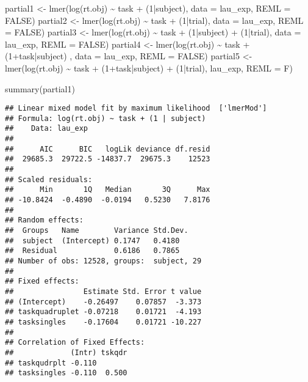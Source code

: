 \documentclass[
]{article}
\newenvironment{Shaded}{\begin{snugshade}}{\end{snugshade}}
\newcommand{\AttributeTok}[1]{\textcolor[rgb]{0.77,0.63,0.00}{#1}}
\newcommand{\ConstantTok}[1]{\textcolor[rgb]{0.00,0.00,0.00}{#1}}
\newcommand{\DecValTok}[1]{\textcolor[rgb]{0.00,0.00,0.81}{#1}}
\newcommand{\FunctionTok}[1]{\textcolor[rgb]{0.00,0.00,0.00}{#1}}
\newcommand{\NormalTok}[1]{#1}
\newcommand{\OtherTok}[1]{\textcolor[rgb]{0.56,0.35,0.01}{#1}}
\newcommand{\SpecialCharTok}[1]{\textcolor[rgb]{0.00,0.00,0.00}{#1}}
\begin{document}
\begin{Shaded}
\begin{Highlighting}[]
\NormalTok{partial1 }\OtherTok{\textless{}{-}} \FunctionTok{lmer}\NormalTok{(}\FunctionTok{log}\NormalTok{(rt.obj) }\SpecialCharTok{\textasciitilde{}}\NormalTok{ task }\SpecialCharTok{+}\NormalTok{ (}\DecValTok{1}\SpecialCharTok{|}\NormalTok{subject), }\AttributeTok{data =}\NormalTok{ lau\_exp, }\AttributeTok{REML =} \ConstantTok{FALSE}\NormalTok{)}
\NormalTok{partial2 }\OtherTok{\textless{}{-}} \FunctionTok{lmer}\NormalTok{(}\FunctionTok{log}\NormalTok{(rt.obj) }\SpecialCharTok{\textasciitilde{}}\NormalTok{ task }\SpecialCharTok{+}\NormalTok{ (}\DecValTok{1}\SpecialCharTok{|}\NormalTok{trial), }\AttributeTok{data =}\NormalTok{ lau\_exp, }\AttributeTok{REML =} \ConstantTok{FALSE}\NormalTok{)}
\NormalTok{partial3 }\OtherTok{\textless{}{-}} \FunctionTok{lmer}\NormalTok{(}\FunctionTok{log}\NormalTok{(rt.obj) }\SpecialCharTok{\textasciitilde{}}\NormalTok{ task }\SpecialCharTok{+}\NormalTok{ (}\DecValTok{1}\SpecialCharTok{|}\NormalTok{subject) }\SpecialCharTok{+}\NormalTok{ (}\DecValTok{1}\SpecialCharTok{|}\NormalTok{trial), }\AttributeTok{data =}\NormalTok{ lau\_exp, }\AttributeTok{REML =} \ConstantTok{FALSE}\NormalTok{)}
\NormalTok{partial4 }\OtherTok{\textless{}{-}} \FunctionTok{lmer}\NormalTok{(}\FunctionTok{log}\NormalTok{(rt.obj) }\SpecialCharTok{\textasciitilde{}}\NormalTok{ task }\SpecialCharTok{+}\NormalTok{ (}\DecValTok{1}\SpecialCharTok{+}\NormalTok{task}\SpecialCharTok{|}\NormalTok{subject) , }\AttributeTok{data =}\NormalTok{ lau\_exp, }\AttributeTok{REML =} \ConstantTok{FALSE}\NormalTok{)}
\NormalTok{partial5 }\OtherTok{\textless{}{-}} \FunctionTok{lmer}\NormalTok{(}\FunctionTok{log}\NormalTok{(rt.obj) }\SpecialCharTok{\textasciitilde{}}\NormalTok{ task }\SpecialCharTok{+}\NormalTok{ (}\DecValTok{1}\SpecialCharTok{+}\NormalTok{task}\SpecialCharTok{|}\NormalTok{subject) }\SpecialCharTok{+}\NormalTok{ (}\DecValTok{1}\SpecialCharTok{|}\NormalTok{trial), lau\_exp, }\AttributeTok{REML =}\NormalTok{ F)}

\FunctionTok{summary}\NormalTok{(partial1)}
\end{Highlighting}
\end{Shaded}

\begin{verbatim}
## Linear mixed model fit by maximum likelihood  ['lmerMod']
## Formula: log(rt.obj) ~ task + (1 | subject)
##    Data: lau_exp
## 
##      AIC      BIC   logLik deviance df.resid 
##  29685.3  29722.5 -14837.7  29675.3    12523 
## 
## Scaled residuals: 
##      Min       1Q   Median       3Q      Max 
## -10.8424  -0.4890  -0.0194   0.5230   7.8176 
## 
## Random effects:
##  Groups   Name        Variance Std.Dev.
##  subject  (Intercept) 0.1747   0.4180  
##  Residual             0.6186   0.7865  
## Number of obs: 12528, groups:  subject, 29
## 
## Fixed effects:
##                Estimate Std. Error t value
## (Intercept)    -0.26497    0.07857  -3.373
## taskquadruplet -0.07218    0.01721  -4.193
## tasksingles    -0.17604    0.01721 -10.227
## 
## Correlation of Fixed Effects:
##             (Intr) tskqdr
## taskqudrplt -0.110       
## tasksingles -0.110  0.500
\end{verbatim}
\end{document}
